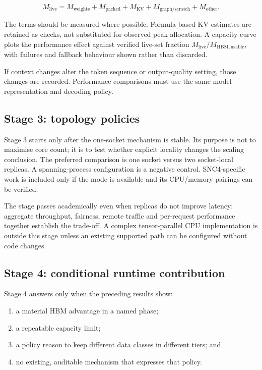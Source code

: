 \[
  M_{\mathrm{live}} =
  M_{\mathrm{weights}} + M_{\mathrm{packed}} + M_{\mathrm{KV}}
  + M_{\mathrm{graph/scratch}} + M_{\mathrm{other}} .
\]

The terms should be measured where possible.  Formula-based KV
estimates are retained as checks, not substituted for observed peak
allocation.  A capacity curve plots the performance effect against
verified live-set fraction \(M_{\mathrm{live}}/M_{\mathrm{HBM,usable}}\),
with failures and fallback behaviour shown rather than discarded.

If context changes alter the token sequence or output-quality setting,
those changes are recorded.  Performance comparisons must use the same
model representation and decoding policy.

\subsection{Stage 3: topology policies}

Stage 3 starts only after the one-socket mechanism is stable.  Its
purpose is not to maximise core count; it is to test whether explicit
locality changes the scaling conclusion.  The preferred comparison is
one socket versus two socket-local replicas.  A spanning-process
configuration is a negative control.  SNC4-specific work is included
only if the mode is available and its CPU/memory pairings can be
verified.

The stage passes academically even when replicas do not improve
latency: aggregate throughput, fairness, remote traffic and
per-request performance together establish the trade-off.  A complex
tensor-parallel CPU implementation is outside this stage unless an
existing supported path can be configured without code changes.

\subsection{Stage 4: conditional runtime contribution}

Stage 4 answers  only when the preceding results show:

\begin{enumerate}
  \item a material HBM advantage in a named phase;
  \item a repeatable capacity limit;
  \item a policy reason to keep different data classes in different
        tiers; and
  \item no existing, auditable mechanism that expresses that policy.
\end{enumerate}

